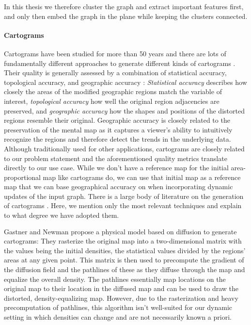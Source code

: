 In this thesis we therefore cluster the graph and extract important features first, and only then embed the graph in the plane while keeping the clusters connected.


\paragraph{Cartograms}

Cartograms have been studied for more than 50 years \cite{tobler2004thirty} and there are lots of fundamentally different approaches to generate different kinds of cartograms \cite{nusrat2016state}.
Their quality is generally assessed by a combination of statistical accuracy, topological accuracy, and geographic accuracy \cite{alam2015quantitative}: \emph{Statistical accuracy} describes how closely the areas of the modified geographic regions match the variable of interest, \emph{topological accuracy} how well the original region adjacencies are preserved, and \emph{geographic accuracy} how the shapes and positions of the distorted regions resemble their original.
Geographic accuracy is closely related to the preservation of the mental map as it captures a viewer's ability to intuitively recognize the regions and therefore detect the trends in the underlying data.
Although traditionally used for other applications, cartograms are closely related to our problem statement and the aforementioned quality metrics translate directly to our use case.
While we don't have a reference map for the initial area-proportional map like cartograms do, we can use that initial map as a reference map that we can base geographical accuracy on when incorporating dynamic updates of the input graph.
There is a large body of literature on the generation of cartograms \cite{tobler2004thirty} \cite{alam2015quantitative} \cite{nusrat2016state}.
Here, we mention only the most relevant techniques and explain to what degree we have adopted them.

Gastner and Newman \cite{gastner2004diffusion} propose a physical model based on diffusion to generate cartograms:
They rasterize the original map into a two-dimensional matrix with the values being the initial densities, \ie{} the statistical values divided by the regions' areas at any given point.
This matrix is then used to precompute the gradient of the diffusion field and the pathlines of these  as they diffuse through the map and equalize the overall density.
The pathlines essentially map locations on the original map to their location in the diffused map and can be used to draw the distorted, density-equalizing map.
However, due to the rasterization and heavy precomputation of pathlines, this algorithm isn't well-suited for our dynamic setting in which densities can change and are not necessarily known a priori.

